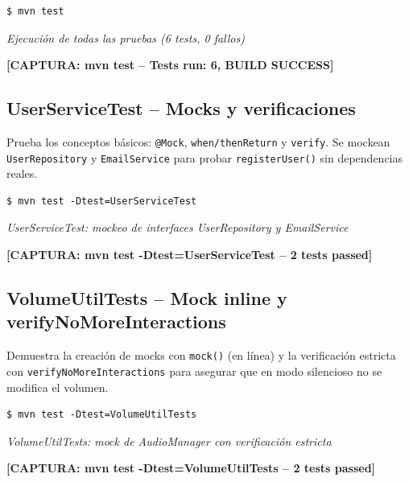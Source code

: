\documentclass{article}
\begin{document}
\begin{verbatim}
$ mvn test
\end{verbatim}

\begin{center}
    \textit{Ejecuci\'on de todas las pruebas (6 tests, 0 fallos)}

    \textbf{[CAPTURA: mvn test -- Tests run: 6, BUILD SUCCESS]}
\end{center}

\subsection{UserServiceTest -- Mocks y verificaciones}

Prueba los conceptos b\'asicos: \texttt{@Mock}, \texttt{when/thenReturn} y \texttt{verify}. Se mockean \texttt{UserRepository} y \texttt{EmailService} para probar \texttt{registerUser()} sin dependencias reales.

\begin{verbatim}
$ mvn test -Dtest=UserServiceTest
\end{verbatim}

\begin{center}
    \textit{UserServiceTest: mockeo de interfaces UserRepository y EmailService}

    \textbf{[CAPTURA: mvn test -Dtest=UserServiceTest -- 2 tests passed]}
\end{center}

\subsection{VolumeUtilTests -- Mock inline y verifyNoMoreInteractions}

Demuestra la creaci\'on de mocks con \texttt{mock()} (en l\'inea) y la verificaci\'on estricta con \texttt{verifyNoMoreInteractions} para asegurar que en modo silencioso no se modifica el volumen.

\begin{verbatim}
$ mvn test -Dtest=VolumeUtilTests
\end{verbatim}

\begin{center}
    \textit{VolumeUtilTests: mock de AudioManager con verificaci\'on estricta}

    \textbf{[CAPTURA: mvn test -Dtest=VolumeUtilTests -- 2 tests passed]}
\end{center}
\end{document}
